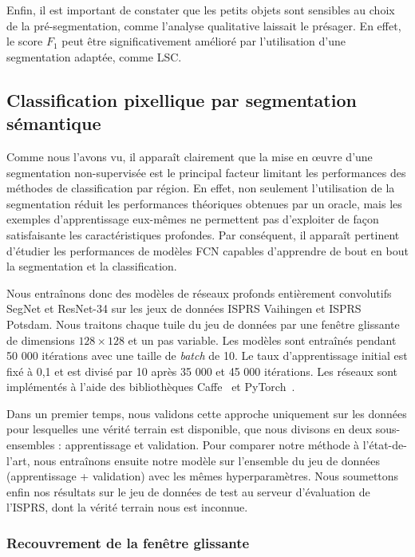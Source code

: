 Enfin, il est important de constater que les petits objets sont sensibles au choix de la pré-segmentation, comme l'analyse qualitative laissait le présager. En effet, le score $F_1$ peut être significativement amélioré par l'utilisation d'une segmentation adaptée, comme \gls{LSC}.

\subsection{Classification pixellique par segmentation sémantique}

Comme nous l'avons vu, il apparaît clairement que la mise en \oe{}uvre d'une segmentation non-supervisée est le principal facteur limitant les performances des méthodes de classification par région. En effet, non seulement l'utilisation de la segmentation réduit les performances théoriques obtenues par un oracle, mais les exemples d'apprentissage eux-mêmes ne permettent pas d'exploiter de façon satisfaisante les caractéristiques profondes. Par conséquent, il apparaît pertinent d'étudier les performances de modèles \gls{FCN} capables d'apprendre de bout en bout la segmentation et la classification.

Nous entraînons donc des modèles de réseaux profonds entièrement convolutifs SegNet et ResNet-34 sur les jeux de données ISPRS Vaihingen et ISPRS Potsdam.
Nous traitons chaque tuile du jeu de données par une fenêtre glissante de dimensions $128 \times 128$ et un pas variable. Les modèles sont entraînés pendant 50 000 itérations avec une taille de \emph{batch} de 10. Le taux d'apprentissage initial est fixé à 0,1 et est divisé par 10 après 35 000 et 45 000 itérations.
Les réseaux sont implémentés à l'aide des bibliothèques Caffe~\cite{jia_caffe_2014} et PyTorch~\cite{paszke_automatic_2017}.

Dans un premier temps, nous validons cette approche uniquement sur les données pour lesquelles une vérité terrain est disponible, que nous divisons en deux sous-ensembles : apprentissage et validation. Pour comparer notre méthode à l'état-de-l'art, nous entraînons ensuite notre modèle sur l'ensemble du jeu de données (apprentissage + validation) avec les mêmes hyperparamètres. Nous soumettons enfin nos résultats sur le jeu de données de test au serveur d'évaluation de l'ISPRS, dont la vérité terrain nous est inconnue.

\subsubsection{Recouvrement de la fenêtre glissante}

